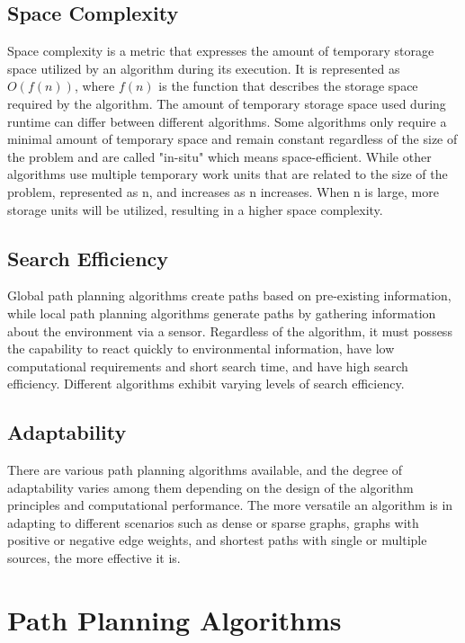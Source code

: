 \documentclass[bibliography=totoc]{scrartcl}
\begin{document}
\subsection{Space Complexity}
Space complexity is a metric that expresses the amount of temporary storage space utilized by an algorithm during its execution. 
It is represented as $O(f(n))$, where $f(n)$ is the function that describes the storage space required by the algorithm. \cite[p. 303]{TheoryComputation}
The amount of temporary storage space used during runtime can differ between different algorithms. 
Some algorithms only require a minimal amount of temporary space and remain constant regardless of the size of the problem and are called "in-situ" which means space-efficient. 
While other algorithms use multiple temporary work units that are related to the size of the problem, represented as n, and increases as n increases. 
When n is large, more storage units will be utilized, resulting in a higher space complexity.

\subsection{Search Efficiency}

Global path planning algorithms create paths based on pre-existing information, while local path planning algorithms generate paths by gathering information about the environment via a sensor. 
Regardless of the algorithm, it must possess the capability to react quickly to environmental information, have low computational requirements and short search time, and have high search efficiency. Different algorithms exhibit varying levels of search efficiency. 

\subsection{Adaptability}
There are various path planning algorithms available, and the degree of adaptability varies among them depending on the design of the algorithm principles and computational performance. 
The more versatile an algorithm is in adapting to different scenarios such as dense or sparse graphs, graphs with positive or negative edge weights, and shortest paths with single or multiple sources, the more effective it is. 

\section{Path Planning Algorithms}
\label{path_planning_algorithm}
\end{document}
